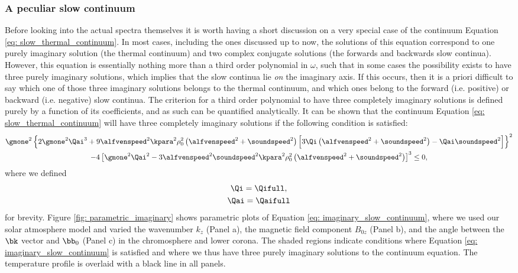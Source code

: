 \subsubsection{A peculiar slow continuum}
Before looking into the actual spectra themselves it is worth having a short discussion on a very special case of the continuum Equation \eqref{eq: slow_thermal_continuum}. In most cases, including the ones discussed up to now, the solutions of this equation correspond to one purely imaginary solution (the thermal continuum) and two complex conjugate solutions (the forwards and backwards slow continua). However, this equation is essentially nothing more than a third order polynomial in $\omega$, such that in some cases the possibility exists to have three purely imaginary solutions, which implies that the slow continua lie \emph{on} the imaginary axis. If this occurs, then it is a priori difficult to say which one of those three imaginary solutions belongs to the thermal continuum, and which ones belong to the forward (i.e. positive) or backward (i.e. negative) slow continua. The criterion for a third order polynomial to have three completely imaginary solutions is defined purely by a function of its coefficients, and as such can be quantified analytically. It can be shown that the continuum Equation \eqref{eq: slow_thermal_continuum} will have three completely imaginary solutions if the following condition is satisfied:
\begin{equation} \label{eq: imaginary_slow_continuum}
  \begin{gathered}
    \gmone^2 \left\{
      2\gmone^2 \Qai^3 + 9\alfvenspeed^2 \kpara^2 \rho_0^2\left(\alfvenspeed^2 + \soundspeed^2\right)\Bigl[
        3\Qi\left(\alfvenspeed^2 + \soundspeed^2\right) - \Qai \soundspeed^2
      \Bigr]
    \right\}^2 \\
    - 4\left[
      \gmone^2 \Qai^2 - 3\alfvenspeed^2\soundspeed^2\kpara^2 \rho_0^2\left(\alfvenspeed^2 + \soundspeed^2\right)
    \right]^3 \leq 0,
  \end{gathered}
\end{equation}
where we defined
\begin{equation}
  \begin{gathered}
    \Qi = \Qifull, \\
    \Qai = \Qaifull
  \end{gathered}
\end{equation}
for brevity. Figure \ref{fig: parametric_imaginary} shows parametric plots of Equation \eqref{eq: imaginary_slow_continuum}, where we used our solar atmosphere model and varied the wavenumber $k_z$ (Panel a), the magnetic field component $B_{0z}$ (Panel b), and the angle between the $\bk$ vector and $\bb_0$ (Panel c) in the chromosphere and lower corona. The shaded regions indicate conditions where Equation \eqref{eq: imaginary_slow_continuum} is satisfied and where we thus have three purely imaginary solutions to the continuum equation. The temperature profile is overlaid with a black line in all panels.

